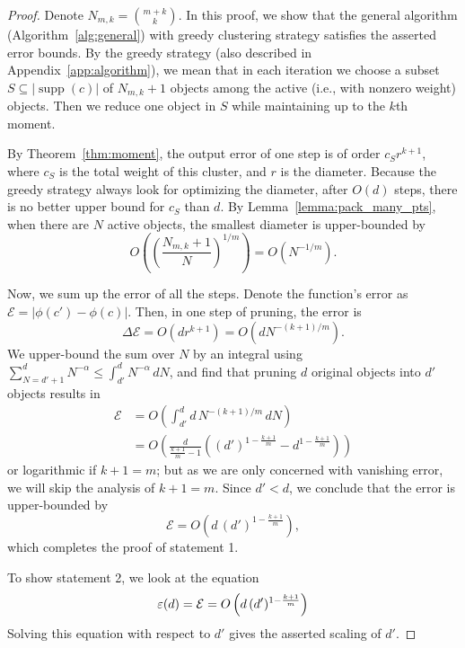 \documentclass{article}
\theoremstyle{plain}
\newcommand{\supp}{\operatorname{supp}}
\def\REV#1{{\color[HTML]{000000}#1}}
\begin{document}
\begin{proof}
    Denote $N_{m,k} = \binom{m+k}{k}$. In this proof, we show that the general algorithm (Algorithm~\ref{alg:general}) with greedy clustering strategy satisfies the asserted error bounds. By the greedy strategy (also described in Appendix~\ref{app:algorithm}), we mean that in each iteration we choose a subset $S\subseteq |\supp(c)|$ of $N_{m,k}+1$ objects among the active (i.e., with nonzero weight) objects. Then we reduce one object in $S$ while maintaining up to the $k$th moment. 
    
    By Theorem~\ref{thm:moment}, the output error of one step is of order $c_S r^{k+1}$, where $c_S$ is the total weight of this cluster, and $r$ is the diameter. Because the greedy strategy always look for optimizing the diameter, after $O(d)$ steps, there is no better upper bound for $c_S$ than $d$. By Lemma~\ref{lemma:pack_many_pts}, when there are $N$ active objects, the smallest diameter is upper-bounded by
    \begin{equation}
        O \left(\left( \frac{N_{m,k}+1}{N} \right)^{1/m} \right) = O(N^{-1/m})  .
    \end{equation}
    
    
    Now, we sum up the error of all the steps. Denote the function's error as $\mathcal{E} = \left| \phi(c') - \phi(c) \right|$. Then, in one step of pruning, the error is 
    \begin{equation}
        \Delta \mathcal{E} = O(dr^{k+1}) = O (d N^{-(k+1)/m})  .
    \end{equation}
    We upper-bound the sum over $N$ by an integral using $\sum_{N=d'+1}^{d} N^{-\alpha} \leq \int_{d'}^{d} N^{-\alpha}\, dN$, and find that pruning $d$ original objects into $d'$ objects results in
    \begin{equation}    \label{eq:intrgral_error}
        \begin{aligned}
            \mathcal{E} &= O\left( \int_{d'}^d d\, N^{-(k+1)/m} \, dN \right) \\
            &= O\left( \frac{d}{\frac{k+1}{m}-1} \left( \left(d'\right)^{1-\frac{k+1}{m}} - d^{1-\frac{k+1}{m}} \right) \right)
        \end{aligned}
    \end{equation}
    or logarithmic if $k+1=m$; but as we are only concerned with vanishing error, we will skip the analysis of $k+1=m$. Since $d'<d$, we conclude that the error is upper-bounded by
    \begin{equation}
        \mathcal{E} = O\left( d \, (d')^{1-\frac{k+1}{m}} \right)   ,
    \end{equation}
    which completes the proof of statement 1. 

    To show statement 2, we look at the equation
    \begin{equation}
        \REV{\varepsilon}(d) = \mathcal{E} = O\left( d \, (d')^{1-\frac{k+1}{m}} \right)
    \end{equation}
    Solving this equation with respect to $d'$ gives the asserted scaling of $d'$. 
\end{proof}
\end{document}
